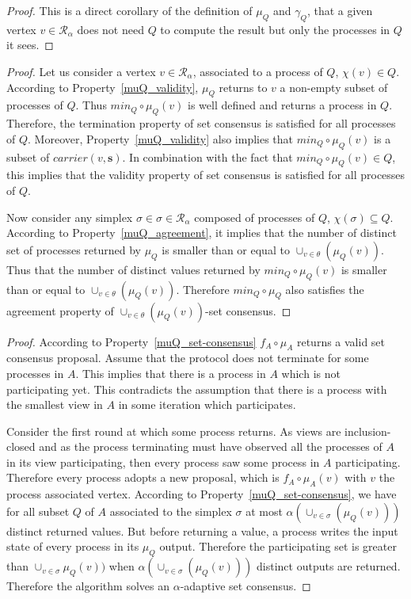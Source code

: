 \documentclass[a4paper]{article}
\def\R{\ensuremath{\mathcal{R}}}
\def\s {\mathbf{s}}
\def\Car{\mathit{carrier}}
\begin{document}
\muQRb*

\begin{proof}
This is a direct corollary of the definition of $\mu_Q$ and $\gamma_Q$, that a given vertex $v\in\R_\alpha$ does not need $Q$ to compute the result but only the processes in $Q$ it sees.
\end{proof}

\muQCons*

\begin{proof}
Let us consider a vertex $v\in\R_\alpha$,
associated to a process of $Q$, $\chi(v)\in Q$.
According to Property~\ref{muQ_validity}, 
$\mu_Q$ returns to $v$ 
a non-empty subset of processes of $Q$. 
Thus ${\mathit{min}}_Q \circ \mu_Q(v)$ is well defined
and returns a process in $Q$. 
Therefore, the termination property of set consensus is satisfied
for all processes of $Q$.
Moreover, Property~\ref{muQ_validity} also implies that
${\mathit{min}}_Q \circ \mu_Q(v)$ is a subset of $\Car(v,\s)$. 
In combination with the fact that ${\mathit{min}}_Q \circ \mu_Q(v)\in Q$,
this implies that the validity property of set consensus is satisfied
for all processes of $Q$.

Now consider any simplex $\sigma\in\sigma\in\R_\alpha$
composed of processes of $Q$, $\chi(\sigma)\subseteq Q$.
According to Property~\ref{muQ_agreement}, it implies that 
the number of distinct set of processes returned by $\mu_Q$
is smaller than or equal to $\cup_{v\in\theta}(\mu_Q(v))$. Thus
that the number of distinct values returned by ${\mathit{min}}_Q \circ \mu_Q(v)$
is smaller than or equal to $\cup_{v\in\theta}(\mu_Q(v))$.
Therefore ${\mathit{min}}_Q \circ \mu_Q$ also satisfies the 
agreement property of $\cup_{v\in\theta}(\mu_Q(v))$-set consensus.
\end{proof}

\alphaPSC*

\begin{proof}
According to Property~\ref{muQ_set-consensus} $f_A\circ \mu_A$ 
returns a valid set consensus proposal. 
Assume that the protocol does not terminate for some processes
in $A$. This implies that there is a process in $A$ which
is not participating yet. This contradicts the assumption 
that there is a process with the smallest view in 
$A$ in some iteration which participates.

Consider the first round at which some process returns.
As views are inclusion-closed and as the process terminating
must have observed all the processes of $A$ in its view participating,
then every process saw some process in $A$ participating.
Therefore every process adopts a new proposal, which is
$f_A\circ \mu_A(v)$ with $v$ the process associated vertex.
According to Property~\ref{muQ_set-consensus}, we have for all
subset $Q$ of $A$ associated to the simplex $\sigma$ at most 
$\alpha(\cup_{v\in\sigma}(\mu_Q(v)))$ distinct returned
values. But before returning a value, a process 
writes the input state of every process in its $\mu_Q$
output. Therefore the participating set is greater than 
$\cup_{v\in\sigma} \mu_Q(v))$ when $\alpha(\cup_{v\in\sigma}(\mu_Q(v)))$
distinct outputs are returned. Therefore the algorithm 
solves an $\alpha$-adaptive set consensus.
\end{proof}
\end{document}
